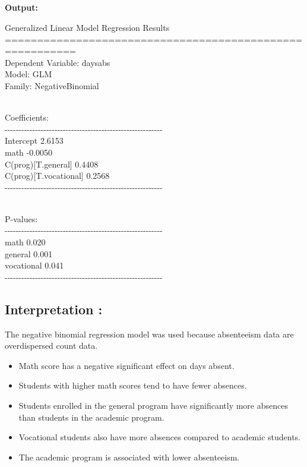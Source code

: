 \documentclass[
]{article}
\begin{document}
\subsection{}\label{section-5}

\textbf{Output:}

Generalized Linear Model Regression Results\\
=========================================================\\
Dependent Variable: daysabs\\
Model: GLM\\
Family: NegativeBinomial\\
\strut \\
Coefficients:\\
-\/-\/-\/-\/-\/-\/-\/-\/-\/-\/-\/-\/-\/-\/-\/-\/-\/-\/-\/-\/-\/-\/-\/-\/-\/-\/-\/-\/-\/-\/-\/-\/-\/-\/-\/-\/-\/-\/-\/-\/-\/-\/-\/-\/-\/-\/-\/-\/-\/-\/-\/-\/-\/-\/-\/-\/-\\
Intercept 2.6153\\
math -0.0050\\
C(prog){[}T.general{]} 0.4408\\
C(prog){[}T.vocational{]} 0.2568\\
-\/-\/-\/-\/-\/-\/-\/-\/-\/-\/-\/-\/-\/-\/-\/-\/-\/-\/-\/-\/-\/-\/-\/-\/-\/-\/-\/-\/-\/-\/-\/-\/-\/-\/-\/-\/-\/-\/-\/-\/-\/-\/-\/-\/-\/-\/-\/-\/-\/-\/-\/-\/-\/-\/-\/-\/-\\
\strut \\
P-values:\\
-\/-\/-\/-\/-\/-\/-\/-\/-\/-\/-\/-\/-\/-\/-\/-\/-\/-\/-\/-\/-\/-\/-\/-\/-\/-\/-\/-\/-\/-\/-\/-\/-\/-\/-\/-\/-\/-\/-\/-\/-\/-\/-\/-\/-\/-\/-\/-\/-\/-\/-\/-\/-\/-\/-\/-\/-\\
math 0.020\\
general 0.001\\
vocational 0.041\\
-\/-\/-\/-\/-\/-\/-\/-\/-\/-\/-\/-\/-\/-\/-\/-\/-\/-\/-\/-\/-\/-\/-\/-\/-\/-\/-\/-\/-\/-\/-\/-\/-\/-\/-\/-\/-\/-\/-\/-\/-\/-\/-\/-\/-\/-\/-\/-\/-\/-\/-\/-\/-\/-\/-\/-\/-

\subsection{\texorpdfstring{\textbf{Interpretation
:}}{Interpretation :}}\label{interpretation-16}

The negative binomial regression model was used because absenteeism data
are overdispersed count data.

\begin{itemize}
\item
  Math score has a negative significant effect on days absent.
\item
  Students with higher math scores tend to have fewer absences.
\item
  Students enrolled in the general program have significantly more
  absences than students in the academic program.
\item
  Vocational students also have more absences compared to academic
  students.
\item
  The academic program is associated with lower absenteeism.
\end{itemize}
\end{document}
